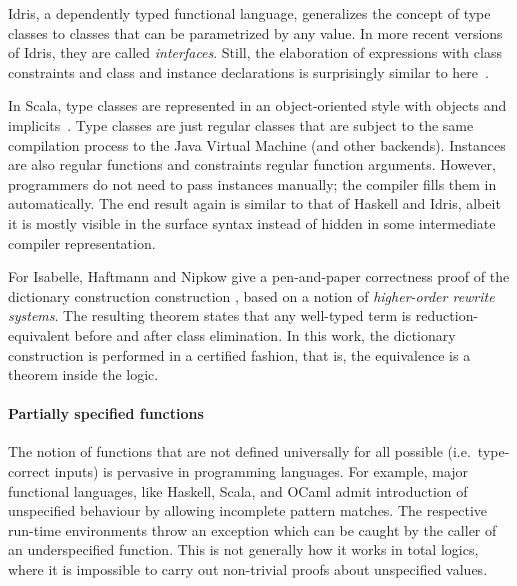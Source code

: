 Idris, a dependently typed functional language, generalizes the concept of type classes to classes that can be parametrized by any value.%
In more recent versions of Idris, they are called \emph{interfaces}.
Still, the elaboration of expressions with class constraints and class and instance declarations is surprisingly similar to here~\cite{brady2013idris}.

In Scala, type classes are represented in an object-oriented style with objects and implicits~\cite{oliveira2010typeclasses}.
Type classes are just regular classes that are subject to the same compilation process to the Java Virtual Machine (and other backends).
Instances are also regular functions and constraints regular function arguments.
However, programmers do not need to pass instances manually; the compiler fills them in automatically.
The end result again is similar to that of Haskell and Idris, albeit it is mostly visible in the surface syntax instead of hidden in some intermediate compiler representation.

For Isabelle, Haftmann and Nipkow give a pen-and-paper correctness proof of the dictionary construction construction \cite[§4.1]{haftmann2010codegeneration}, based on a notion of \emph{higher-order rewrite systems}.
The resulting theorem states that any well-typed term is reduction-equivalent before and after class elimination.
In this work, the dictionary construction is performed in a certified fashion, that is, the equivalence is a theorem inside the logic.

\paragraph{Partially specified functions}
The notion of functions that are not defined universally for all possible (i.e.\ type-correct inputs) is pervasive in programming languages.
For example, major functional languages, like Haskell, Scala, and OCaml admit introduction of unspecified behaviour by allowing incomplete pattern matches.
The respective run-time environments throw an exception which can be caught by the caller of an underspecified function.
This is not generally how it works in total logics, where it is impossible to carry out non-trivial proofs about unspecified values.

